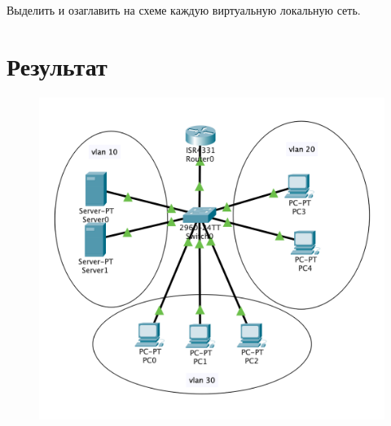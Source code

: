 \documentclass[a4paper,oneside,12pt]{extreport}
\begin{document}
Выделить и озаглавить на схеме каждую виртуальную локальную сеть.

\section{Результат}

\begin{figure}[H]
	\centering
	\includegraphics[width=0.7\linewidth]{inc/img/result.png}
\end{figure}
\end{document}
